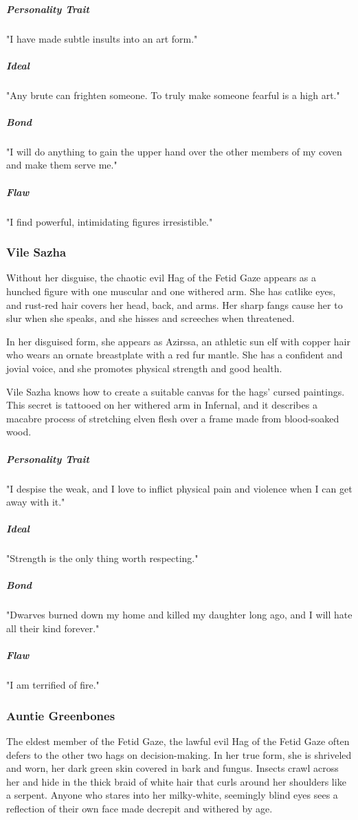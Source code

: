 \documentclass[10pt,a4paper,twoside,bg=print,twocolumn,openany,nodeprecatedcode]{dndbook}
\begin{document}
\subparagraph{Personality Trait}
"I have made subtle insults into an art form."

\subparagraph{Ideal}
"Any brute can frighten someone. To truly make someone fearful is a high art."

\subparagraph{Bond}
"I will do anything to gain the upper hand over the other members of my coven and make them serve me."

\subparagraph{Flaw}
"I find powerful, intimidating figures irresistible."

\subsubsection{Vile Sazha}
Without her disguise, the chaotic evil Hag of the Fetid Gaze appears as a hunched figure with one muscular and one withered arm. She has catlike eyes, and rust-red hair covers her head, back, and arms. Her sharp fangs cause her to slur when she speaks, and she hisses and screeches when threatened.

In her disguised form, she appears as Azirssa, an athletic sun elf with copper hair who wears an ornate breastplate with a red fur mantle. She has a confident and jovial voice, and she promotes physical strength and good health.

Vile Sazha knows how to create a suitable canvas for the hags' cursed paintings. This secret is tattooed on her withered arm in Infernal, and it describes a macabre process of stretching elven flesh over a frame made from blood-soaked wood.

\subparagraph{Personality Trait}
"I despise the weak, and I love to inflict physical pain and violence when I can get away with it."

\subparagraph{Ideal}
"Strength is the only thing worth respecting."

\subparagraph{Bond}
"Dwarves burned down my home and killed my daughter long ago, and I will hate all their kind forever."

\subparagraph{Flaw}
"I am terrified of fire."

\subsubsection{Auntie Greenbones}
The eldest member of the Fetid Gaze, the lawful evil Hag of the Fetid Gaze often defers to the other two hags on decision-making. In her true form, she is shriveled and worn, her dark green skin covered in bark and fungus. Insects crawl across her and hide in the thick braid of white hair that curls around her shoulders like a serpent. Anyone who stares into her milky-white, seemingly blind eyes sees a reflection of their own face made decrepit and withered by age.
\end{document}
